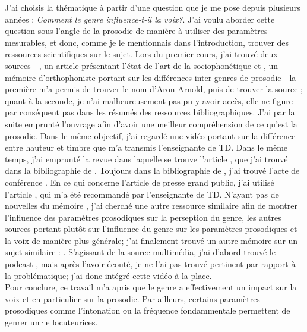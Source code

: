  J'ai choisis la thématique à partir d'une question que je me pose depuis plusieurs années : \textit{Comment le genre influence-t-il la voix?}. J'ai voulu aborder cette question sous l'angle de la prosodie de manière à utiliser des paramètres mesurables, et donc, comme je le mentionnais dans l'introduction, trouver des ressources scientifiques sur le sujet.
 Lors du premier cours, j'ai trouvé deux sources - \cite{Can15}, un article présentant l'état de l'art de la sociophonétique et \cite{Lek16}, un mémoire d'orthophoniste portant sur les différences inter-genres de prosodie - la première m'a permis de trouver le nom d'Aron Arnold, puis de trouver la source \cite{Pep20}; quant à la seconde, je n'ai malheureusement pas pu y avoir accès, elle ne figure par conséquent pas dans les résumés des ressources bibliographiques. 
 J'ai par la suite emprunté l'ouvrage \cite{DiC13} afin d'avoir une meilleur compréhension de ce qu'est la prosodie. Dans le même objectif, j'ai regardé une vidéo portant sur la différence entre hauteur et timbre que m'a transmis l'enseignante de TD. 
 Dans le même temps, j'ai emprunté la revue dans laquelle se trouve l'article \cite{Boe75}, que j'ai trouvé dans la bibliographie de \cite{Pep20}.
 Toujours dans la bibliographie de \cite{Pep20}, j'ai trouvé l'acte de conférence \cite{Pep16}.
 En ce qui concerne l'article de presse grand public, j'ai utilisé l'article \cite{Bro18}, qui m'a été recommandé par l'enseignante de TD.
 N'ayant pas de nouvelles du mémoire \cite{Lek16}, j'ai cherché une autre ressource similaire afin de montrer l'influence des paramètres prosodiques sur la perseption du genre, les autres sources portant plutôt sur l'influence du genre sur les paramètres prosodiques et la voix de manière plus générale; j'ai finalement trouvé un autre mémoire sur un sujet similaire : \cite{Gar22}.
 S'agissant de la source multimédia, j'ai d'abord trouvé le podcast \cite{podcast}, mais après l'avoir écouté, je ne l'ai pas trouvé pertinent par rapport à la problématique; j'ai donc intégré cette vidéo \cite{video} à la place.\\

 Pour conclure, ce travail m'a apris que le genre a effectivement un impact sur la voix et en particulier sur la prosodie. Par ailleurs, certains paramètres prosodiques comme l'intonation ou la fréquence fondammentale permettent de genrer un·e locuteurices.\\

